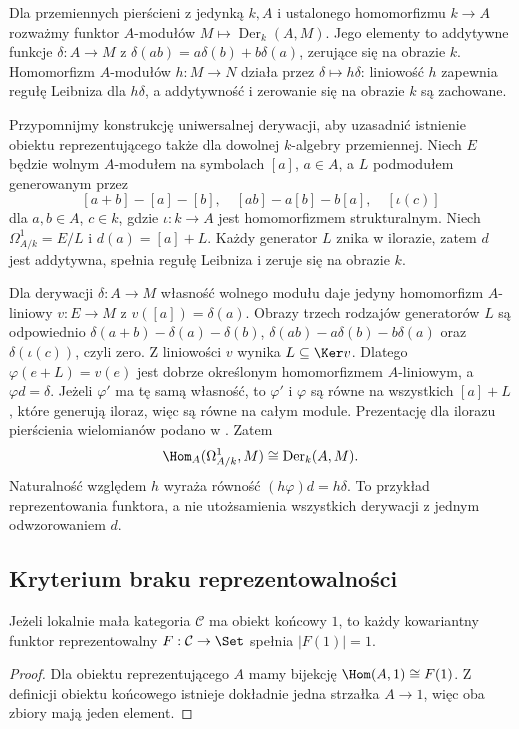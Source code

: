 \begin{przyklad}\label{cat:ex:kahler-rep}
Dla przemiennych pierścieni z jedynką $k,A$ i ustalonego homomorfizmu $k\to A$ rozważmy funktor $A$-modułów
$M\mapsto\operatorname{Der}_k(A,M)$. Jego elementy to addytywne funkcje $\delta:A\to M$ z $\delta(ab)=a\delta(b)+b\delta(a)$, zerujące się na obrazie $k$. Homomorfizm $A$-modułów $h:M\to N$ działa przez $\delta\mapsto h\delta$: liniowość $h$ zapewnia regułę Leibniza dla $h\delta$, a addytywność i zerowanie się na obrazie $k$ są zachowane.

Przypomnijmy konstrukcję uniwersalnej derywacji, aby uzasadnić istnienie obiektu reprezentującego także dla dowolnej $k$-algebry przemiennej. Niech $E$ będzie wolnym $A$-modułem na symbolach $[a]$, $a\in A$, a $L$ podmodułem generowanym przez
\[
[a+b]-[a]-[b],\quad [ab]-a[b]-b[a],
\quad [\iota(c)]
\]
dla $a,b\in A$, $c\in k$, gdzie $\iota:k\to A$ jest homomorfizmem strukturalnym. Niech $\Omega^1_{A/k}=E/L$ i $d(a)=[a]+L$. Każdy generator $L$ znika w ilorazie, zatem $d$ jest addytywna, spełnia regułę Leibniza i zeruje się na obrazie $k$.

Dla derywacji $\delta:A\to M$ własność wolnego modułu daje jedyny homomorfizm $A$-liniowy $v:E\to M$ z $v([a])=\delta(a)$. Obrazy trzech rodzajów generatorów $L$ są odpowiednio
$\delta(a+b)-\delta(a)-\delta(b)$, $\delta(ab)-a\delta(b)-b\delta(a)$ oraz $\delta(\iota(c))$, czyli zero. Z liniowości $v$ wynika $L\subseteq\Ker v$. Dlatego $\varphi(e+L)=v(e)$ jest dobrze określonym homomorfizmem $A$-liniowym, a $\varphi d=\delta$. Jeżeli $\varphi'$ ma tę samą własność, to $\varphi'$ i $\varphi$ są równe na wszystkich $[a]+L$, które generują iloraz, więc są równe na całym module. Prezentację dla ilorazu pierścienia wielomianów podano w . Zatem
\[
\Hom_A(\Omega^1_{A/k},M)\cong\operatorname{Der}_k(A,M).
\]
Naturalność względem $h$ wyraża równość $(h\varphi)d=h\delta$.
To przykład reprezentowania funktora, a nie utożsamienia wszystkich derywacji z jednym odwzorowaniem $d$.
\end{przyklad}

\subsection{Kryterium braku reprezentowalności}

\begin{stwierdzenie}\label{cat:prop:rep-terminal}
Jeżeli lokalnie mała kategoria $\mathcal C$ ma obiekt końcowy $1$, to każdy kowariantny funktor reprezentowalny $F:\mathcal C\to\Set$ spełnia $|F(1)|=1$.
\end{stwierdzenie}
\begin{proof}
Dla obiektu reprezentującego $A$ mamy bijekcję $\Hom(A,1)\cong F(1)$. Z definicji obiektu końcowego istnieje dokładnie jedna strzałka $A\to1$, więc oba zbiory mają jeden element.
\end{proof}

